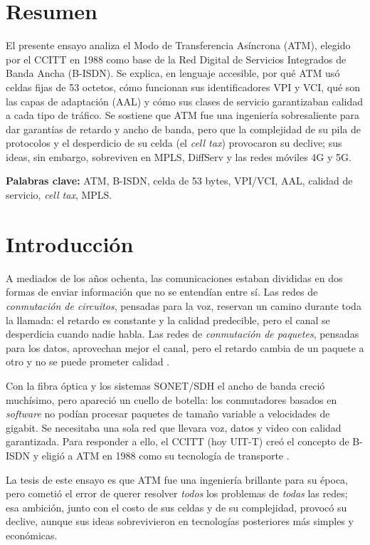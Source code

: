 \documentclass[12pt,a4paper]{article}
\begin{document}
\section{Resumen}

El presente ensayo analiza el Modo de Transferencia Asíncrona (ATM), elegido por el CCITT en 1988 como base de la Red Digital de Servicios Integrados de Banda Ancha (B-ISDN). Se explica, en lenguaje accesible, por qué ATM usó celdas fijas de 53 octetos, cómo funcionan sus identificadores VPI y VCI, qué son las capas de adaptación (AAL) y cómo sus clases de servicio garantizaban calidad a cada tipo de tráfico. Se sostiene que ATM fue una ingeniería sobresaliente para dar garantías de retardo y ancho de banda, pero que la complejidad de su pila de protocolos y el desperdicio de su celda (el \emph{cell tax}) provocaron su declive; sus ideas, sin embargo, sobreviven en MPLS, DiffServ y las redes móviles 4G y 5G.

\noindent\textbf{Palabras clave:} ATM, B-ISDN, celda de 53 bytes, VPI/VCI, AAL, calidad de servicio, \emph{cell tax}, MPLS.

\section{Introducción}

A mediados de los años ochenta, las comunicaciones estaban divididas en dos formas de enviar información que no se entendían entre sí. Las redes de \emph{conmutación de circuitos}, pensadas para la voz, reservan un camino durante toda la llamada: el retardo es constante y la calidad predecible, pero el canal se desperdicia cuando nadie habla. Las redes de \emph{conmutación de paquetes}, pensadas para los datos, aprovechan mejor el canal, pero el retardo cambia de un paquete a otro y no se puede prometer calidad \cite{tanenbaum2012, stallings2004}.

Con la fibra óptica y los sistemas SONET/SDH el ancho de banda creció muchísimo, pero apareció un cuello de botella: los conmutadores basados en \emph{software} no podían procesar paquetes de tamaño variable a velocidades de gigabit. Se necesitaba una sola red que llevara voz, datos y video con calidad garantizada. Para responder a ello, el CCITT (hoy UIT-T) creó el concepto de B-ISDN y eligió a ATM en 1988 como su tecnología de transporte \cite{itui150, deprycker1995}.

La tesis de este ensayo es que ATM fue una ingeniería brillante para su época, pero cometió el error de querer resolver \emph{todos} los problemas de \emph{todas} las redes; esa ambición, junto con el costo de sus celdas y de su complejidad, provocó su declive, aunque sus ideas sobrevivieron en tecnologías posteriores más simples y económicas.
\end{document}
